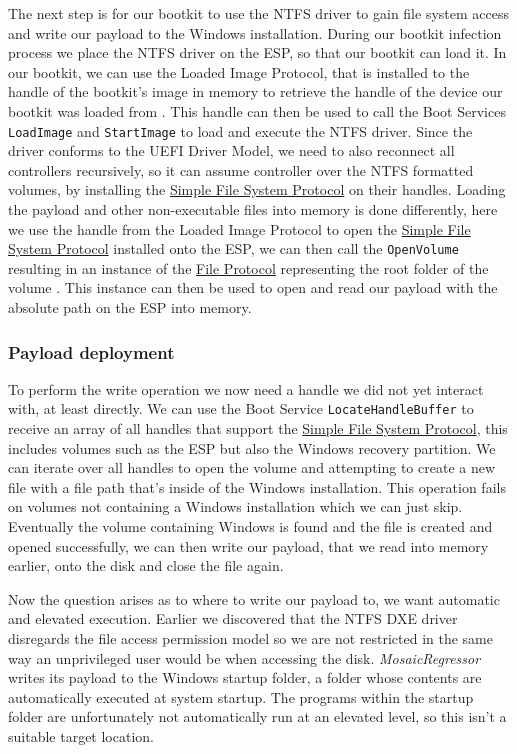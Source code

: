 The next step is for our bootkit to use the \ac{NTFS} driver to gain file system access and write our payload to the Windows installation.
During our bootkit infection process we place the \ac{NTFS} driver on the \ac{ESP}, so that our bootkit can load it.
In our bootkit, we can use the Loaded Image Protocol, that is installed to the handle of the bootkit's image in memory to retrieve the handle of the device our bootkit was loaded from \cite[Section 9.1]{uefi-spec}.
This handle can then be used to call the Boot Services \lstinline{LoadImage} and \lstinline{StartImage} to load and execute the NTFS driver.
Since the driver conforms to the UEFI Driver Model, we need to also reconnect all controllers recursively, so it can assume controller over the NTFS formatted volumes, by installing the \hyperref[lst:simple-file-system-protocol]{Simple File System Protocol} on their handles.
Loading the payload and other non-executable files into memory is done differently, here we use the handle from the Loaded Image Protocol to open the \hyperref[lst:simple-file-system-protocol]{Simple File System Protocol} installed onto the \ac{ESP}, we can then call the \lstinline{OpenVolume} resulting in an instance of the \hyperref[lst:simple-file-system-protocol]{File Protocol} representing the root folder of the volume \cite[Section 13.4]{uefi-spec}.
This instance can then be used to open and read our payload with the absolute path on the \ac{ESP} into memory.

\subsubsection{Payload deployment}

To perform the write operation we now need a handle we did not yet interact with, at least directly.
We can use the Boot Service \lstinline{LocateHandleBuffer} to receive an array of all handles that support the \hyperref[lst:simple-file-system-protocol]{Simple File System Protocol}, this includes volumes such as the \ac{ESP} but also the Windows recovery partition.
We can iterate over all handles to open the volume and attempting to create a new file with a file path that's inside of the Windows installation.
This operation fails on volumes not containing a Windows installation which we can just skip.
Eventually the volume containing Windows is found and the file is created and opened successfully, we can then write our payload, that we read into memory earlier, onto the disk and close the file again.

Now the question arises as to where to write our payload to, we want automatic and elevated execution.
Earlier we discovered that the \ac{NTFS} \ac{DXE} driver disregards the file access permission model  so we are not restricted in the same way an unprivileged user would be when accessing the disk.
\emph{MosaicRegressor} writes its payload to the Windows startup folder, a folder whose contents are automatically executed at system startup.
The programs within the startup folder are unfortunately not automatically run at an elevated level, so this isn't a suitable target location.

